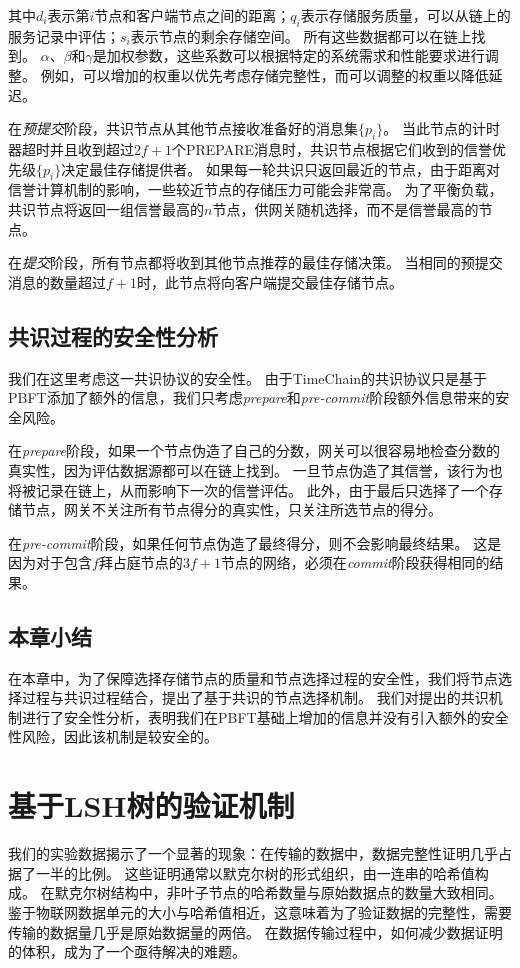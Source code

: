 其中$d_i$表示第$i$节点和客户端节点之间的距离；$q_i$表示存储服务质量，可以从链上的服务记录中评估；$s_i$表示节点的剩余存储空间。
所有这些数据都可以在链上找到。
$\alpha$、$\beta$和$\gamma$是加权参数，这些系数可以根据特定的系统需求和性能要求进行调整。
例如，可以增加的权重以优先考虑存储完整性，而可以调整的权重以降低延迟。

在\textit{预提交}阶段，共识节点从其他节点接收准备好的消息集$\{p_i\}$。
当此节点的计时器超时并且收到超过$2f+1$个PREPARE消息时，共识节点根据它们收到的信誉优先级$\{p_i\}$决定最佳存储提供者。
如果每一轮共识只返回最近的节点，由于距离对信誉计算机制的影响，一些较近节点的存储压力可能会非常高。
为了平衡负载，共识节点将返回一组信誉最高的$n$节点，供网关随机选择，而不是信誉最高的节点。

在\textit{提交}阶段，所有节点都将收到其他节点推荐的最佳存储决策。
当相同的预提交消息的数量超过$f+1$时，此节点将向客户端提交最佳存储节点。

\section{共识过程的安全性分析}
我们在这里考虑这一共识协议的安全性。
由于TimeChain的共识协议只是基于PBFT添加了额外的信息，我们只考虑\textit{prepare}和\textit{pre-commit}阶段额外信息带来的安全风险。

在\textit{prepare}阶段，如果一个节点伪造了自己的分数，网关可以很容易地检查分数的真实性，因为评估数据源都可以在链上找到。
一旦节点伪造了其信誉，该行为也将被记录在链上，从而影响下一次的信誉评估。
此外，由于最后只选择了一个存储节点，网关不关注所有节点得分的真实性，只关注所选节点的得分。

在\textit{pre-commit}阶段，如果任何节点伪造了最终得分，则不会影响最终结果。
这是因为对于包含$f$拜占庭节点的$3f+1$节点的网络，必须在\textit{commit}阶段获得相同的结果。

\section{本章小结}
在本章中，为了保障选择存储节点的质量和节点选择过程的安全性，我们将节点选择过程与共识过程结合，提出了基于共识的节点选择机制。
我们对提出的共识机制进行了安全性分析，表明我们在PBFT基础上增加的信息并没有引入额外的安全性风险，因此该机制是较安全的。

\chapter{基于LSH树的验证机制}
\label{sec:lsh}
我们的实验数据揭示了一个显著的现象：在传输的数据中，数据完整性证明几乎占据了一半的比例。
这些证明通常以默克尔树的形式组织，由一连串的哈希值构成。
在默克尔树结构中，非叶子节点的哈希数量与原始数据点的数量大致相同。
鉴于物联网数据单元的大小与哈希值相近，这意味着为了验证数据的完整性，需要传输的数据量几乎是原始数据量的两倍。
在数据传输过程中，如何减少数据证明的体积，成为了一个亟待解决的难题。

